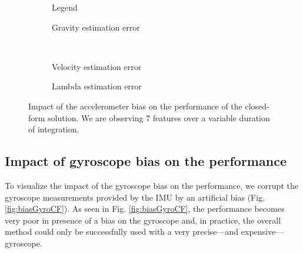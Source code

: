 \documentclass[letterpaper, 10 pt, conference]{ieeeconf}  %
\begin{document}
\begin{figure}
  \centering
        \hspace{0.2\columnwidth}%
        \begin{subfigure}[b]{0.3\columnwidth}
                \resizebox{\columnwidth}{!}{}
                \caption{Legend}

        \end{subfigure}%
        \begin{subfigure}[b]{0.5\columnwidth}
                \resizebox{\columnwidth}{!}{}
                \caption{Gravity estimation error}

        \end{subfigure}
        ~
        \begin{subfigure}[b]{0.5\columnwidth}
                \resizebox{\columnwidth}{!}{}
                \caption{Velocity estimation error}

        \end{subfigure}%
        \begin{subfigure}[b]{0.5\columnwidth}
                \resizebox{\columnwidth}{!}{}
                \caption{Lambda estimation error}

        \end{subfigure}
        \caption{Impact of the accelerometer bias on the performance of the closed-form solution. We are observing 7 features  over a variable duration of integration.\label{fig:biasAccCF}}
\end{figure}



\subsection{Impact of gyroscope bias on the performance}
To visualize the impact of the gyroscope bias on the performance,
we corrupt the gyroscope measurements provided by the IMU by an artificial bias (Fig. \ref{fig:biasGyroCF}).
As seen in Fig. \ref{fig:biasGyroCF}, the performance becomes very poor in presence of a bias on the gyroscope and, in practice, the overall method could only be successfully used with a very precise---and expensive---gyroscope.

\end{document}
